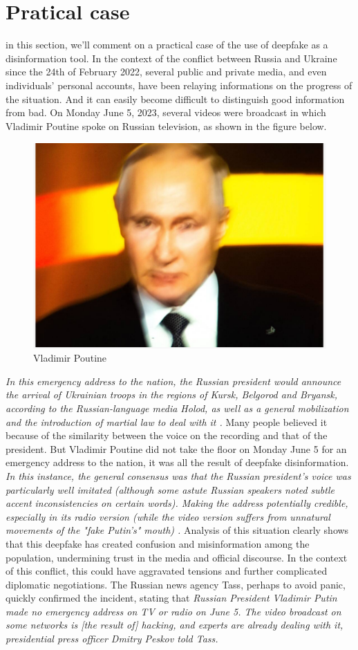 \section{Pratical case}
in this section, we'll comment on a practical case of the use of deepfake as a disinformation tool.
In the context of the conflict between Russia and Ukraine since the 24th of February 2022, several public and private 
media, and even individuals' personal accounts, have been relaying informations on the progress of the situation. 
And it can easily become difficult to distinguish good information from bad.  On Monday June 5, 2023, several 
videos were broadcast in which Vladimir Poutine  spoke on Russian television, as shown in the figure below.
\
\begin{figure}[h]
    \centering
    \includegraphics[width=0.5\linewidth]{images/poutine.PNG}
    \caption{Vladimir Poutine \cite{coquazDeepfakeFauxMessage}}
    \label{fig:enter-label}
\end{figure}


 \emph{In this emergency address to the nation, the Russian president would announce the arrival of Ukrainian troops in the regions of Kursk, Belgorod and Bryansk, according to the Russian-language media Holod, as well as a general mobilization and the introduction of martial law to deal with it \cite{coquazDeepfakeFauxMessage}.}
Many people believed it because of the similarity between the voice on the recording and that of the president. But Vladimir Poutine did not take the floor on Monday June 5 for an emergency address to the nation, it was all the result of deepfake disinformation. 
\emph{In this instance, the general consensus was that the Russian president's voice was particularly well imitated (although some astute Russian speakers noted subtle accent inconsistencies on certain words). Making the address potentially credible, especially in its radio version (while the video version suffers from unnatural movements of the "fake Putin's" mouth) \cite{coquazDeepfakeFauxMessage}.}
Analysis of this situation clearly shows that this deepfake has created confusion and misinformation among the population, undermining trust in the media and official discourse. In the context of this conflict, this could have aggravated tensions and further complicated diplomatic negotiations. The Russian news agency Tass, perhaps to avoid panic, quickly confirmed the incident, stating that \emph{Russian President Vladimir Putin made no emergency address on TV or radio on June 5. The video broadcast on some networks is [the result of] hacking, and experts are already dealing with it, presidential press officer Dmitry Peskov told Tass.\cite{coquazDeepfakeFauxMessage}}